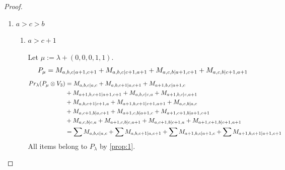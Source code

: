 \begin{proof}
\begin{enumerate}
\begin{enumerate}
\begin{table}[htbp]
\begin{tabular}{cc}
{ $M_{a+2,a+1,a+2|a+2,a+2}$,
 $M_{a+3,a+2,a+1|a+3,a+2}$,
 $M_{a+2,a+3,a+1|a+2,a+3}$,
 $M_{a+3,a+2,a+1|a+2,a+3}$, \\
 $M_{a+3,a+1,a+2|a+2,a+3}$
}\\
 & \\
 $P_{a+1,a+2,a+1|a+1,a+2}$ & \makecell{
 $M_{a+2,a+2,a+1|a+2,a+2}$,
 $M_{a+1,a+3,a+1|a+1,a+3}$,
 $M_{a+1,a+2,a+2|a+2,a+2}$,
 $M_{a+3,a+2,a+1|a+2,a+3}$, \\
 $M_{a+1,a+3,a+2|a+3,a+2}$,
 $M_{a+1,a+3,a+2|a+2,a+3}$,
 $M_{a+1,a+2,a+3|a+2,a+3}$,
 $M_{a+3,a+1,a+1|a+1,a+3}$, \\
 $M_{a+2,a+1,a+2|a+2,a+2}$,
 $M_{a+3,a+1,a+2|a+3,a+2}$,
 $M_{a+2,a+3,a+1|a+3,a+2}$,
 $M_{a+3,a+2,a+1|a+3,a+2}$, \\
 $M_{a+3,a+1,a+2|a+2,a+3}$,
 $M_{a+2,a+3,a+1|a+2,a+3}$,
 $M_{a+2,a+1,a+3|a+2,a+3}$
}\\
\bottomrule
\end{tabular}
\vspace{0.5em}
\parbox{\linewidth}{\small
\textbf{Interpretation:}
This table displays only selected computational results. This partial presentation does not affect our conclusion.
}
\end{table}
      \end{enumerate}

    \item $a>c>b$
      \begin{enumerate}
        \item $a>c+1$ \par
        Let $\mu:=\lambda + (0,0,0,1,1) $.
        \begin{equation}\notag
          \begin{aligned}
            P_\mu = M_{a,b,c|a+1,c+1}
+ M_{a,b,c|c+1,a+1}
+ M_{a,c,b|a+1,c+1}
+ M_{a,c,b|c+1,a+1}
          \end{aligned}
        \end{equation}
        \begin{equation}\notag
          \begin{aligned}
            Pr_{\lambda}(P_\mu \otimes V_{3}) &=
M_{a,b,c|a,c}
+ M_{a,b,c+1|a,c+1}
+ M_{a+1,b,c|a+1,c}\\
                                              &
+ M_{a+1,b,c+1|a+1,c+1}
+ M_{a,b,c|c,a}
+ M_{a+1,b,c|c,a+1}\\
                                              &
+ M_{a,b,c+1|c+1,a}
+ M_{a+1,b,c+1|c+1,a+1}
+ M_{a,c,b|a,c}\\
                                              &
+ M_{a,c+1,b|a,c+1}
+ M_{a+1,c,b|a+1,c}
+ M_{a+1,c+1,b|a+1,c+1}\\
                                              &
+ M_{a,c,b|c,a}
+ M_{a+1,c,b|c,a+1}
+ M_{a,c+1,b|c+1,a}
+ M_{a+1,c+1,b|c+1,a+1} \\
                                               &=
\sum M_{a,b,c|a,c}
+ \sum M_{a,b,c+1|a,c+1}
+ \sum M_{a+1,b,c|a+1,c}
+ \sum M_{a+1,b,c+1|a+1,c+1}
          \end{aligned}
        \end{equation}
All items belong to $P_\lambda$ by \cref{prop:1}.


\end{enumerate}
\end{enumerate}
\end{proof}
